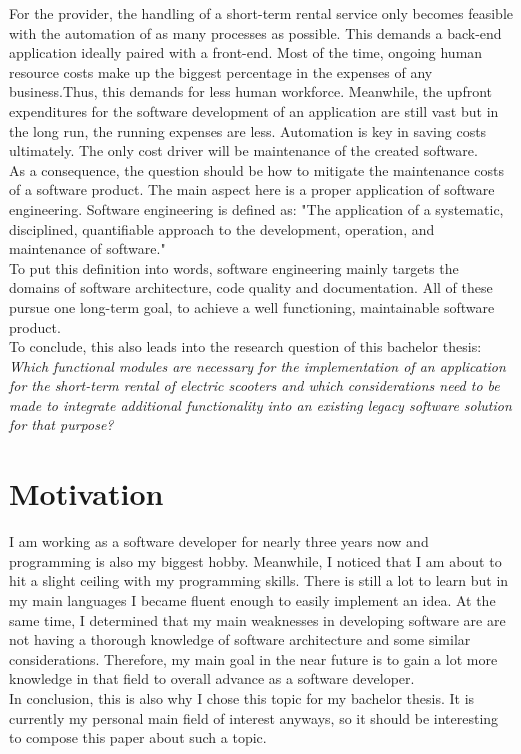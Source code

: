 \documentclass[12pt,a4paper]{report}
\begin{document}
For the provider, the handling of a short-term rental service
only becomes feasible with the automation of as many processes as possible.
This demands a back-end application ideally paired with a front-end.
Most of the time, ongoing human resource costs make up the biggest percentage
in the expenses of any business.\cn Thus, this demands for less human workforce.
Meanwhile, the upfront expenditures for the software development of
an application are still vast but in the long run, the running expenses are less.
Automation is key in saving costs ultimately. The only cost driver will be maintenance
of the created software.\\
As a consequence, the question should be how to mitigate the maintenance costs
of a software product. The main aspect here is a proper application of software engineering.
Software engineering is defined as: "The application of a systematic, disciplined,
quantifiable approach to the development, operation, and maintenance of software."~\cite{se-ieee}\\
To put this definition into words, software engineering mainly targets
the domains of software architecture, code quality and documentation.
All of these pursue one long-term goal, to achieve a well functioning, maintainable
software product.\\
To conclude, this also leads into the research question of this bachelor thesis:\\
\emph{Which functional modules are necessary for the implementation of an application
for the short-term rental of electric scooters and which considerations need to be made
to integrate additional functionality into an existing legacy software solution for that purpose?}


\section{Motivation}

I am working as a software developer for nearly three years now and programming
is also my biggest hobby. Meanwhile, I noticed that I am about to hit a slight
ceiling with my programming skills. There is still a lot to learn but in my main
languages I became fluent enough to easily implement an idea.
At the same time, I determined that my main weaknesses in developing software are
are not having a thorough knowledge of software architecture and some similar considerations.
Therefore, my main goal in the near future is to gain a lot more knowledge in that field
to overall advance as a software developer.\\
In conclusion, this is also why I chose this topic for my bachelor thesis.
It is currently my personal main field of interest anyways, so it should be
interesting to compose this paper about such a topic.
\end{document}
